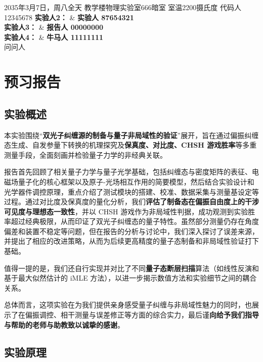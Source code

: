 
{2035年3月7日，周八全天}
{教学楼物理实验室666暗室}
{室温2200摄氏度}
{代码人 12345678}
{\textcolor{StructureColor}{\textbf{实验人2：}} &  \textbf{实验人 87654321} \\
	\textcolor{StructureColor}{\textbf{实验人3：}} &  \textbf{报告人 00000000} \\
	\textcolor{StructureColor}{\textbf{实验人4：}} &  \textbf{牛马人 11111111} \\}
{问问人}

\clearpage
\setcounter{section}{0}
\section{预习报告}

\subsection{实验概述}
本实验围绕“\textbf{双光子纠缠源的制备与量子非局域性的验证}”展开，旨在通过偏振纠缠态生成、自发参量下转换的机理探究及\textbf{保真度、对比度、CHSH 游戏胜率}等多重测量手段，全面刻画并检验量子力学的非经典关联。

报告首先回顾了相关量子力学与量子光学基础，包括纠缠态与密度矩阵的表征、电磁场量子化的核心框架以及原子-光场相互作用的简要模型，然后结合实验设计和光学器件调控原理，重点介绍了测试模块的搭建、校准、数据采集与测量基设定等过程。通过对比度及保真度的量化分析，我们\textbf{评估了制备态在偏振自由度上的干涉可见度与理想态一致性}，并以 CHSH 游戏作为非局域性判据，成功观测到实验胜率超过经典极限，从而印证了双光子纠缠态的量子特性。虽然部分测量仍存在角度偏差和装置不稳定等问题，但在报告的分析与讨论中，我们深入探讨了误差来源，并提出了相应的改进策略，从而为后续更高精度的量子态制备和非局域性验证打下基础。

值得一提的是，我们还自行实现并对比了不同\textbf{量子态断层扫描}算法（如线性反演和基于最大似然估计的 iMLE 方法），以进一步揭示数值方法和实验细节之间的耦合关系。

总体而言，这项实验在为我们提供亲身感受量子纠缠与非局域性魅力的同时，也展示了在偏振调控、相干测量与误差修正等方面的综合实力，最后谨\textbf{向给予我们指导与帮助的老师与助教致以诚挚的感谢}。

\subsection{实验原理}

